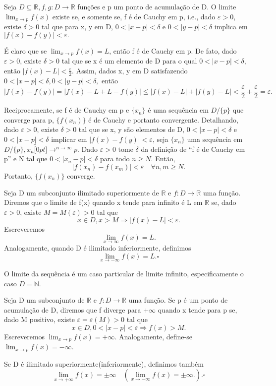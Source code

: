 \documentclass[Analysis/analysis_notes.tex]{subfiles}
\begin{document}
\begin{theorem*}
	Seja $D\subseteq{\mathbb{R}}, f, g:D\rightarrow \mathbb{R}$ fun\c c\~oes e p um ponto de acumula\c c\~ao de D. O limite
	$\lim_{x\to p}f(x)$ existe se, e somente se, f \'e de Cauchy em p, i.e., dado $\varepsilon > 0$, existe $\delta > 0$ tal que
	para x, y em D, $0<|x-p|<\delta$ e $0<|y-p|<\delta$ implica em $|f(x)-f(y)|<\varepsilon.$
\end{theorem*}
\begin{proof*}
	\'E claro que se $\lim_{x\to p}f(x) = L$, ent\~ao f \'e de Cauchy em p. De fato, dado $\varepsilon > 0$, existe $\delta > 0$
	tal que se x \'e um elemento de D para o qual $0<|x-p|<\delta,$ ent\~ao $|f(x)-L|<\frac{\varepsilon}{2}.$ Assim, dados
	x, y em D satisfazendo $0<|x-p|<\delta, 0<|y-p|<\delta,$ ent\~ao
	$$
		|f(x)-f(y)| = |f(x)-L+L-f(y)|\leq{|f(x)-L| + |f(y)-L|}< \frac{\varepsilon}{2}+\frac{\varepsilon}{2} = \varepsilon.
	$$

	Reciprocamente, se f \'e de Cauchy em p e $\{x_{n}\}$ \'e uma sequ\^encia em $D/\{p\}$ que converge para p,
	$\{f(x_{n})\}$ \'e de Cauchy e portanto convergente. Detalhando, dado $\varepsilon > 0$, existe $\delta > 0$ tal que
	se x, y s\~ao elementos de D, $0 < |x-p| <\delta$ e $0 < |x-p| <\delta$ implicar em $|f(x)-f(y)|<\varepsilon$,
	seja $\{x_{n}\}$ uma sequ\^encia em $D/\{p\}, x_{n}\overbracket[0pt]{\longrightarrow}^{n\to \infty}p$. Dado $\varepsilon > 0$
	tome $\delta$ da defini\c c\~ao de ``f \'e de Cauchy em p'' e N tal que $0<|x_{n}-p|<\delta$ para todo $n\geq{N}.$ Ent\~ao,
	$$
		|f(x_{n})-f(x_{m})| < \varepsilon\quad \forall n, m\geq{N}.
	$$
	Portanto, $\{f(x_{n})\}$ converge. \qedsymbol
\end{proof*}
\begin{def*}
	Seja D um subconjunto ilimitado superiormente de $\mathbb{R}$ e $f:D\rightarrow \mathbb{R}$ uma fun\c c\~ao. Diremos que
	o limite de f(x) quando x tende para infinito \'e L em $\mathbb{R}$ se, dado $\varepsilon > 0$, existe $M = M(\varepsilon) > 0$
	tal que
	$$
		x\in D, x > M \Rightarrow |f(x)-L|<\varepsilon.
	$$
	Escreveremos
	$$
		\lim_{x\to\infty}f(x) = L.
	$$
	Analogamente, quando D \'e ilimitado inferiormente, definimos
	$$
		\lim_{x\to-\infty}f(x) = L.\square
	$$
\end{def*}
O limite da sequ\^encia \'e um caso particular de limite infinito, especificamente o caso $D = \mathbb{N}.$
\begin{def*}
	Seja D um subconjunto de $\mathbb{R}$ e $f:D\rightarrow \mathbb{R}$ uma fun\c c\~ao. Se p \'e um ponto de acumula\c c\~ao de D,
	diremos que f diverge para $+\infty$ quando x tende para p se, dado M positivo, existe $\varepsilon = \varepsilon(M) > 0$
	tal que
	$$
		x\in D, 0<|x-p|<\varepsilon \Rightarrow f(x) > M.
	$$
	Escreveremos $\lim_{x\to p}f(x) = +\infty$. Analogamente, define-se $\lim_{x\to p}f(x) =-\infty$.

	Se D \'e ilimitado superiormente(inferiormente), definimos tamb\'em
	$$
		\lim_{x\to+\infty}f(x) = \pm\infty\quad(\lim_{x\to-\infty}f(x)=\pm\infty.). \square
	$$
\end{def*}
\end{document}
